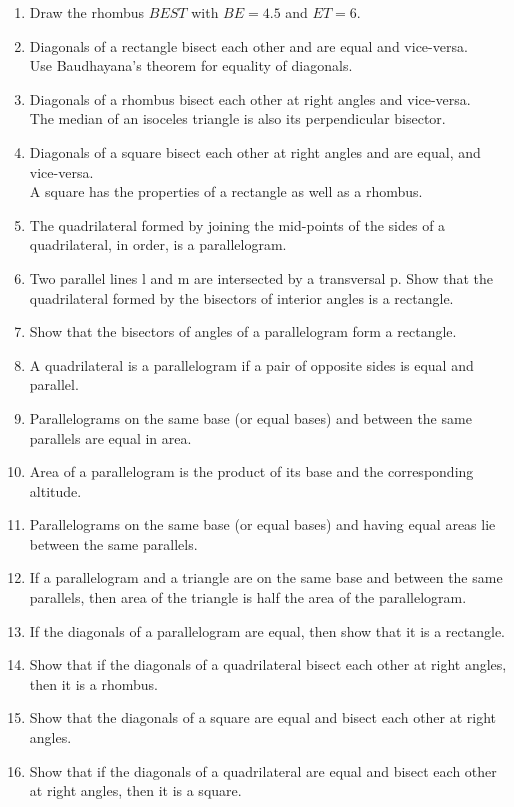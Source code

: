\begin{enumerate}[label=\arabic*.,ref=\thesubsection.\theenumi]
\item Draw the rhombus $BEST$ with $BE = 4.5$ and $ET = 6$. 
\\
\solution 
\item  Diagonals of a rectangle bisect each other and are equal and vice-versa. 
%
\\
\solution Use Baudhayana's theorem for equality of diagonals.
%
\item  Diagonals of a rhombus bisect each other at right angles and vice-versa. 
%
\\
\solution The median of an isoceles triangle is also its perpendicular bisector.
%
\item  Diagonals of a square bisect each other at right angles and are equal, and vice-versa. 
%
\\
\solution A square has the properties of a rectangle as well as a rhombus.
%
%
\item  The quadrilateral formed by joining the mid-points of the sides of a quadrilateral, in order, is a parallelogram.
%
%
\item Two parallel lines l and m are intersected by a transversal p. Show that the quadrilateral formed by the bisectors of interior angles is a rectangle.
%
\item Show that the bisectors of angles of a parallelogram form a rectangle.
%
\item A quadrilateral is a parallelogram if a pair of opposite sides is equal and parallel.
%
\item Parallelograms on the same base (or equal bases) and between the same parallels are equal in area.
\item Area of a parallelogram is the product of its base and the corresponding altitude. 
\item Parallelograms on the same base (or equal bases) and having equal areas lie between the same parallels.
\item If a parallelogram and a triangle are on the same base and between the same parallels, then area of the triangle is half the area of the parallelogram.
%
\item If the diagonals of a parallelogram are equal, then show that it is a rectangle. 
\item Show that if the diagonals of a quadrilateral bisect each other at right angles, then it is a rhombus.
\item Show that the diagonals of a square are equal and bisect each other at right angles. 
\item Show that if the diagonals of a quadrilateral are equal and bisect each other at right angles, then it is a square.
%
\end{enumerate}
